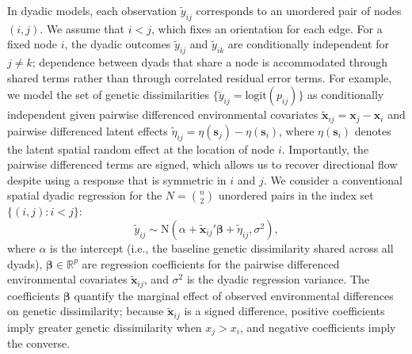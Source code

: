 \documentclass{article}
\begin{document}
In dyadic models, each observation $\widetilde{y}_{ij}$ corresponds to an unordered pair of nodes $(i,j)$. 
We assume that $i<j$, which fixes an orientation for each edge.
For a fixed node $i$, the dyadic outcomes $\widetilde{y}_{ij}$ and $\widetilde{y}_{ik}$ are conditionally independent for $j\ne k$; dependence between dyads that share a node is accommodated through shared terms rather than through correlated residual error terms.
For example, we model the set of genetic dissimilarities $\{\widetilde{y}_{ij}=\text{logit}(p_{ij})\}$ as conditionally independent given pairwise differenced environmental covariates $\widetilde{\mathbf{x}}_{ij}=\mathbf{x}_j-\mathbf{x}_i$ and pairwise differenced latent effects $\widetilde{\eta}_{ij}=\eta(\mathbf{s}_j)-\eta(\mathbf{s}_i)$, where $\eta(\mathbf{s}_i)$ denotes the latent spatial random effect at the location of node $i$. Importantly, the pairwise differenced terms are signed, which allows us to recover directional flow despite using a response that is symmetric in $i$ and $j$.
We consider a conventional spatial dyadic regression for the $N={n \choose 2}$ unordered pairs in the index set$\{(i,j):i<j\}$:
\begin{equation}\label{eq:mini}
    \widetilde{y}_{ij}\sim \text{N}\left(\alpha+\mathbf{\widetilde{x}}_{ij}'\boldsymbol{\beta} + \widetilde{\eta}_{ij},\sigma^2\right),
\end{equation}
where $\alpha$ is the intercept (i.e., the baseline genetic dissimilarity shared across all dyads),
$\boldsymbol{\beta}\in\mathbb{R}^p$ are regression coefficients for the pairwise differenced environmental covariates $\widetilde{\mathbf{x}}_{ij}$, and $\sigma^2$ is the dyadic regression variance. 
The coefficients $\boldsymbol\beta$ quantify the marginal effect of observed environmental differences on genetic dissimilarity; because $\widetilde{\mathbf{x}}_{ij}$ is a signed difference, positive coefficients imply greater genetic dissimilarity when $x_j>x_i$, and negative coefficients imply the converse.
\end{document}
